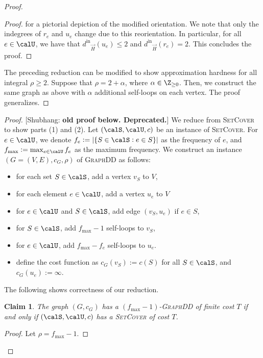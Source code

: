 \documentclass{article}
\newtheorem{claim}{Claim}[section]
\newcommand{\indegree}{\ensuremath{d^{\text{in}}}\xspace}
\newcommand{\shubhang}[1]{{\color{blue}[{\tiny Shubhang: \bf #1}]\marginpar{\color{blue}*}}}
\newcommand{\densitydeletionset}{\textsc{GraphDD}\xspace}
\newcommand{\setcover}{\textsc{SetCover}\xspace}
\begin{document}
\begin{proof}
\begin{proof}
for a pictorial depiction of the modified orientation. We note that only the indegrees of $r_e$ and $u_e$ change due to this reorientation. In particular, for all $e \in \calU$, we have that $\indegree_{\vec{H}}(u_e) \leq 2$ and $\indegree_{\vec{H}}(r_e) = 2$. This concludes the proof.
     \end{proof}
    The preceding reduction can be modified to show approximation hardness for all integral $\rho \geq 2$. Suppose that $\rho = 2 + \alpha$, where $\alpha \in \Z_{\geq 0}$. Then, we construct the same graph as above with $\alpha$ additional self-loops on each vertex. The proof generalizes.
\end{proof}


\iffalse
\begin{proof}\shubhang{old proof below. Deprecated.}
We reduce from \setcover to show parts (1) and (2). Let $(\calS, \calU, c)$ be an instance of \setcover. For $e \in \calU$, we denote $f_e := |\{S \in \calS : e \in S\}|$ as the frequency of $e$, and $f_{\max} := \max_{e\in \calU} f_e$ as the maximum frequency. We construct an instance $(G = (V, E), c_G, \rho)$ of \densitydeletionset as follows:
\begin{itemize}
    \item for each set $S \in \calS$, add a vertex $v_S$ to $V$,
    \item for each element $e \in \calU$, add a vertex $u_e$ to $V$
    \item for $e\in \calU$ and $S \in \calS$, add edge $(v_S, u_e)$ if $e \in S$,
    \item for $S \in \calS$, add $f_{\max} - 1$ self-loops to $v_S$,
    \item for $e \in \calU$, add $f_{\max} - f_e$ self-loops to $u_e$.
    \item define the cost function as $c_G(v_S) := c(S)$ for all $S \in \calS$, and $c_G(u_e) := \infty$.
\end{itemize}
The following shows correctness of our reduction.
\begin{claim}
    The graph $(G, c_G)$ has a $(f_{\max} - 1)$-\densitydeletionset of finite cost $T$ if and only if $(\calS, \calU, c)$ has a \setcover of cost $T$.
\end{claim}
\begin{proof}
    Let $\rho = f_{\max} - 1$.

\end{proof}
\end{proof}
\end{document}
